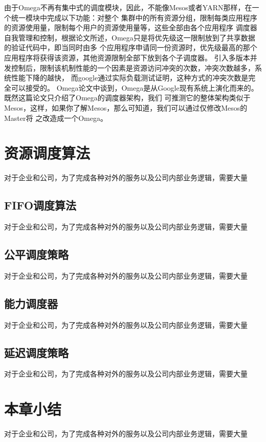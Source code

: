 由于Omega不再有集中式的调度模块，因此，不能像Mesos或者YARN那样，在一个统一模块中完成以下功能：对整个
集群中的所有资源分组，限制每类应用程序的资源使用量，限制每个用户的资源使用量等，这些全部由各个应用程序
调度器自我管理和控制，根据论文所述，Omega只是将优先级这一限制放到了共享数据的验证代码中，即当同时由多
个应用程序申请同一份资源时，优先级最高的那个应用程序将获得该资源，其他资源限制全部下放到各个子调度器。
引入多版本并发控制后，限制该机制性能的一个因素是资源访问冲突的次数，冲突次数越多，系统性能下降的越快，
而google通过实际负载测试证明，这种方式的冲突次数是完全可以接受的。
Omega论文中谈到，Omega是从Google现有系统上演化而来的。既然这篇论文只介绍了Omega的调度器架构，我们
可推测它的整体架构类似于Mesos，这样，如果你了解Mesos，那么可知道，我们可以通过仅修改Mesos的Master将
之改造成一个Omega。

\section{资源调度算法}

对于企业和公司，为了完成各种对外的服务以及公司内部业务逻辑，需要大量

\subsection{FIFO调度算法}
对于企业和公司，为了完成各种对外的服务以及公司内部业务逻辑，需要大量
\subsection{公平调度策略}
对于企业和公司，为了完成各种对外的服务以及公司内部业务逻辑，需要大量
\subsection{能力调度器}
对于企业和公司，为了完成各种对外的服务以及公司内部业务逻辑，需要大量
\subsection{延迟调度策略}
对于企业和公司，为了完成各种对外的服务以及公司内部业务逻辑，需要大量

\section{本章小结}

对于企业和公司，为了完成各种对外的服务以及公司内部业务逻辑，需要大量
